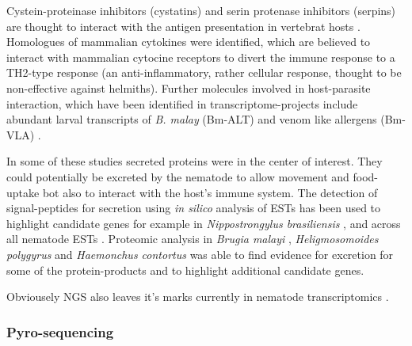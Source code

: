 Cystein-proteinase inhibitors (cystatins) and serin protenase
inhibitors (serpins) are thought to interact with the antigen
presentation in vertebrat hosts \cite{pmid11406138}. Homologues of
mammalian cytokines were identified, which are believed to interact
with mammalian cytocine receptors to divert the immune response to a
TH2-type response \cite{maizels_helminth_2004} (an anti-inflammatory,
rather cellular response, thought to be non-effective against
helmiths). Further molecules involved in host-parasite interaction,
which have been identified in transcriptome-projects include abundant
larval transcripts of \textit{B. malay} (Bm-ALT)
\cite{gomez-escobar_abundant_2002} and venom like allergens (Bm-VLA)
\cite{pmid11704277}.

In some of these studies secreted proteins were in the center of
interest. They could potentially be excreted by the nematode to allow
movement and food-uptake bot also to interact with the host's immune
system. The detection of signal-peptides for secretion using
\textit{in silico} analysis of ESTs has been used to highlight
candidate genes for example in \textit{Nippostrongylus brasiliensis}
\cite{harcus_signal_2004}, and across all nematode ESTs
\cite{nagaraj_needles_2008}. Proteomic analysis in \textit{Brugia
  malayi} \cite{pmid19352421,pmid18958170}, \textit{Heligmosomoides
  polygyrus} \cite{pmid21722761} and \textit{Haemonchus contortus}
\cite{pmid12576473} was able to find evidence for excretion for some
of the protein-products and to highlight additional candidate genes.

Obviousely NGS also leaves it's marks currently in nematode
transcriptomics \cite{pmid22044053}.

\subsubsection{Pyro-sequencing}
\label{sec:pyro-seq}



